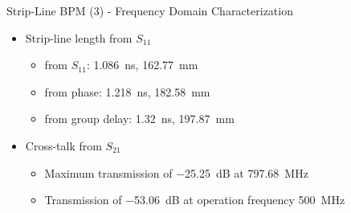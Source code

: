 \documentclass{beamer}
\begin{document}
\begin{frame}[t,fragile]{Strip-Line BPM (3) - Frequency Domain Characterization}
\begin{itemize}
\item Strip-line length from $S_{11}$
\begin{itemize}
\item from $S_{11}$: \SI{1.086}{\nano\second}, \SI{162.77}{\mm}
\item from phase: \SI{1.218}{\nano\second}, \SI{182.58}{\mm}
\item from group delay: \SI{1.32}{\nano\second}, \SI{197.87}{\mm}
\end{itemize}
\item Cross-talk from $S_{21}$
\begin{itemize}
\item Maximum transmission of \SI{-25.25}{\dB} at \SI{797.68}{\MHz}
\item Transmission of \SI{-53.06}{\dB} at operation frequency \SI{500}{\MHz}
\end{itemize}
\end{itemize}

\begin{figure}
  \centering\setcounter{subfigure}{0}
  \quad
  \\
\end{figure}

\end{frame}
\end{document}
